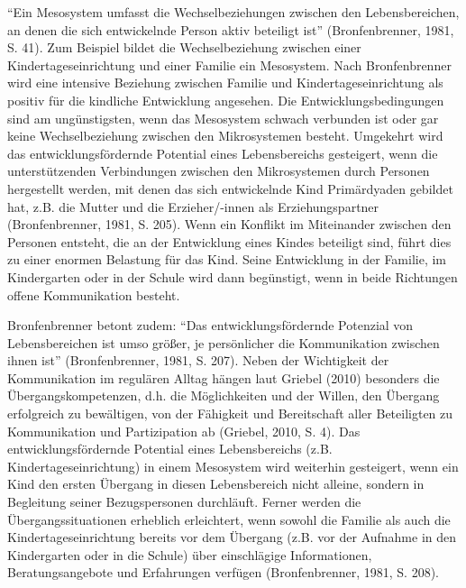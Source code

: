 \documentclass[12pt,a4paper]{article}
\begin{document}
	"`Ein Mesosystem umfasst die Wechselbeziehungen zwischen den Lebensbereichen, an denen die sich entwickelnde Person aktiv beteiligt ist"' (Bronfenbrenner, 1981, S. 41). Zum Beispiel bildet die Wechselbeziehung zwischen einer Kindertageseinrichtung und einer Familie ein Mesosystem. Nach Bron\-fen\-bre\-nner wird eine intensive Beziehung zwischen Familie und Kindertageseinrichtung als positiv für die kindliche Entwicklung angesehen. Die Entwicklungsbedingungen sind am ungünstigsten, wenn das Mesosystem schwach verbunden ist oder gar keine Wechselbeziehung zwischen den Mikrosystemen besteht. Umgekehrt wird das entwicklungsfördernde Potential eines Lebensbereichs gesteigert, wenn die unterstützenden Verbindungen zwischen den Mikrosystemen durch Personen hergestellt werden, mit denen das sich entwickelnde Kind Primärdyaden gebildet hat, z.B. die Mutter und die Erzieher/-innen als Erziehungspartner (Bronfenbrenner, 1981, S. 205). Wenn ein Konflikt im Miteinander zwischen den Personen entsteht, die an der Entwicklung eines Kindes beteiligt sind, führt dies zu einer enormen Belastung für das Kind. Seine Entwicklung in der Familie, im Kindergarten oder in der Schule wird dann begünstigt, wenn in beide Richtungen offene Kommunikation besteht. 
	
Bronfenbrenner betont zudem: "`Das entwicklungsfördernde Potenzial von Lebensbereichen ist umso größer, je persönlicher die Kommunikation zwischen ihnen ist"' (Bronfenbrenner, 1981, S. 207). Neben der Wichtigkeit der Kommunikation im regulären Alltag hängen laut Griebel (2010) besonders die Über\-gangs\-kompe\-ten\-zen, d.h. die Möglichkeiten und der Willen, den Übergang erfolgreich zu bewältigen, von der Fähigkeit und Bereitschaft aller Beteiligten zu Kommunikation und Partizipation ab (Griebel, 2010, S. 4). Das entwicklungsfördernde Potential eines Lebensbereichs (z.B. Kindertageseinrichtung) in einem Mesosystem wird weiterhin gesteigert, wenn ein Kind den ersten Übergang in diesen Lebensbereich nicht alleine, sondern in Begleitung seiner Bezugspersonen durchläuft. Ferner werden die Übergangssituationen erheblich erleichtert, wenn sowohl die Familie als auch die Kindertageseinrichtung bereits vor dem Übergang  (z.B. vor der Aufnahme in den Kindergarten oder in die Schule) über einschlägige Informationen, Beratungsangebote und Erfahrungen verfügen (Bronfenbrenner, 1981, S. 208).
\end{document}
